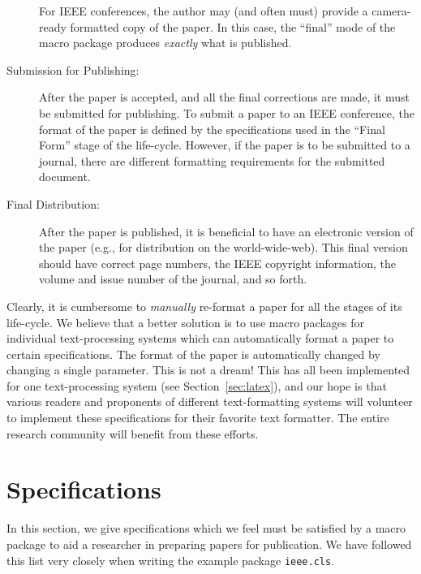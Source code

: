 \documentclass[%
	final,
	notitlepage,
	narroweqnarray,
	inline,
	twoside,
	]{ieee}
\begin{document}
\begin{description}
    For IEEE conferences, the author may (and often must) provide a
    camera-ready formatted copy of the paper. In this case, the 
    ``final'' mode of the macro package produces \emph{exactly} what 
    is published.
\item[Submission for Publishing:] After the paper is accepted,
    and all the final corrections are made, it must be submitted for 
    publishing. To submit a paper to an IEEE conference, the format of 
    the paper is defined by the specifications used in the ``Final Form'' 
    stage of the life-cycle. However, if the paper is to be submitted
    to a journal, there are different formatting requirements for the
    submitted document.
\item[Final Distribution:] After the paper is published, it is
    beneficial to have an electronic version of the paper
    (e.g., for distribution on the world-wide-web). This final
    version should have correct page numbers, the IEEE copyright 
    information, the volume and issue number of the journal, and so forth.
\end{description}

Clearly, it is cumbersome to \emph{manually} re-format a paper for all
the stages of its life-cycle. We believe that a better solution is to
use macro packages for individual text-processing systems which can
automatically format a paper to certain specifications.  The format of
the paper is automatically changed by changing a single parameter.
This is not a dream! This has all been implemented for one
text-processing system (see Section~\ref{sec:latex}), and our hope is
that various readers and proponents of different text-formatting
systems will volunteer to implement these specifications for their
favorite text formatter. The entire research community will benefit
from these efforts.

\section{Specifications}

In this section, we give specifications which we feel must be
satisfied by a macro package to aid a researcher in preparing papers
for publication. We have followed this list very closely when writing
the example package \texttt{ieee.cls}.

\end{document}
